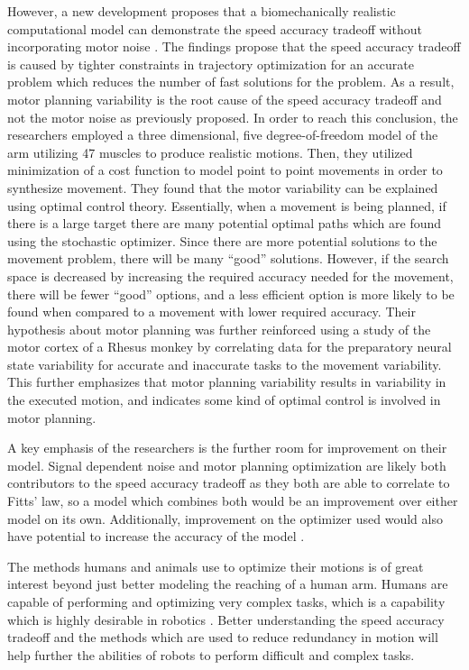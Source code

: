 \documentclass[table,12pt]{article}
\begin{document}
 However, a new development proposes that a biomechanically realistic computational model can demonstrate the speed accuracy tradeoff without incorporating motor noise \cite{c5}. The findings propose that the speed accuracy tradeoff is caused by tighter constraints in trajectory optimization for an accurate problem which reduces the number of fast solutions for the problem. As a result, motor planning variability is the root cause of the speed accuracy tradeoff and not the motor noise as previously proposed. In order to reach this conclusion, the researchers employed a three dimensional, five degree-of-freedom model of the arm utilizing 47 muscles to produce realistic motions. Then, they utilized minimization of a cost function to model point to point movements in order to synthesize movement. They found that the motor variability can be explained using optimal control theory. Essentially, when a movement is being planned, if there is a large target there are many potential optimal paths which are found using the stochastic optimizer. Since there are more potential solutions to the movement problem, there will be many “good” solutions. However, if the search space is decreased by increasing the required accuracy needed for the movement, there will be fewer “good” options, and a less efficient option is more likely to be found when compared to a movement with lower required accuracy. Their hypothesis about motor planning was further reinforced using a study of the motor cortex of a Rhesus monkey by correlating data for the preparatory neural state variability for accurate and inaccurate tasks to the movement variability. This further emphasizes that motor planning variability results in variability in the executed motion, and indicates some kind of optimal control is involved in motor planning.

A key emphasis of the researchers is the further room for improvement on their model. Signal dependent noise and motor planning optimization are likely both contributors to the speed accuracy tradeoff as they both are able to correlate to Fitts’ law, so a model which combines both would be an improvement over either model on its own. Additionally, improvement on the optimizer used would also have potential to increase the accuracy of the model \cite{c4}.

The methods humans and animals use to optimize their motions is of great interest beyond just better modeling the reaching of a human arm. Humans are capable of performing and optimizing very complex tasks, which is a capability which is highly desirable in robotics \cite{c6}. Better understanding the speed accuracy tradeoff and the methods which are used to reduce redundancy in motion will help further the abilities of robots to perform difficult and complex tasks.
\end{document}
